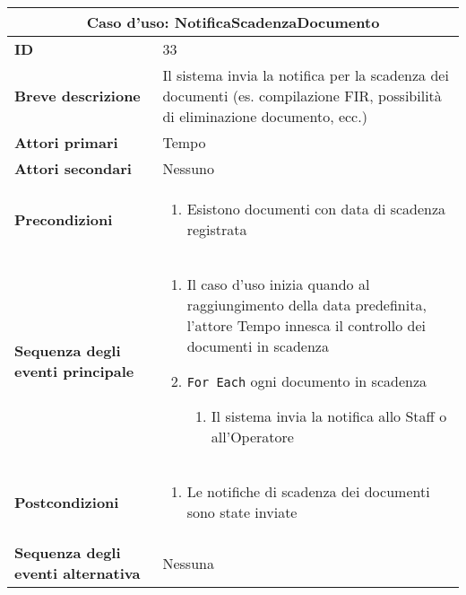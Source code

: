 \documentclass[a4paper]{report}
\begin{document}
\clearpage
\begin{table}[H]
\vspace*{-0cm}
\renewcommand{\arraystretch}{1.9}
\begin{tabular}{|p{3.9cm}|p{9.9cm}|}
\hline
\multicolumn{2}{|c|}{\textbf{Caso d’uso: NotificaScadenzaDocumento}} \\ \hline
	\textbf{ID} & 33 \\ \hline
	\textbf{Breve descrizione} & Il sistema invia la notifica per la scadenza dei documenti (es. compilazione FIR, possibilità di eliminazione documento, ecc.) \\ \hline
	\textbf{Attori primari} & Tempo \\ \hline
	\textbf{Attori secondari} & Nessuno \\ \hline
	\textbf{Precondizioni} & \begin{enumerate}[leftmargin=14pt,label=\arabic*.,labelsep=0.5em,topsep=0pt,partopsep=0pt,parsep=0pt,itemsep=0pt]
        \item Esistono documenti con data di scadenza registrata
    \end{enumerate} \\ \hline
	\textbf{Sequenza degli eventi principale} & 
\begin{enumerate}[leftmargin=14pt,label=\arabic*.,labelsep=0.5em,topsep=0pt,partopsep=0pt,parsep=0pt,itemsep=0pt]
    \item Il caso d’uso inizia quando al raggiungimento della data predefinita, l’attore Tempo innesca il controllo dei documenti in scadenza
    \item \texttt{For Each} ogni documento in scadenza
    \begin{enumerate}[label=\arabic{enumi}.\arabic*.,leftmargin=22pt,labelsep=0.5em,topsep=0pt,partopsep=0pt,parsep=0pt,itemsep=0pt]
        \item Il sistema invia la notifica allo Staff o all’Operatore
    \end{enumerate}
\end{enumerate}\\ \hline
	\textbf{Postcondizioni} & \begin{enumerate}[label=\arabic*.,leftmargin=14pt,labelsep=0.5em,topsep=0pt,partopsep=0pt,parsep=0pt,itemsep=0pt]
        \item Le notifiche di scadenza dei documenti sono state inviate
    \end{enumerate} \\ \hline
	\textbf{Sequenza degli eventi alternativa} & Nessuna \\ \hline
\end{tabular}
\end{table}
\end{document}
